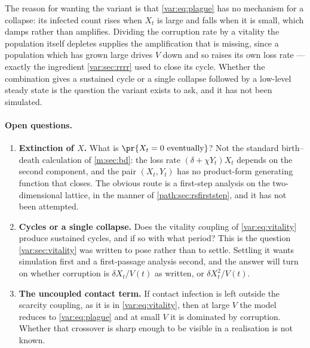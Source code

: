 The reason for wanting the variant is that \cref{var:eq:plague} has no
mechanism for a collapse: its infected count rises when $X_t$ is large and
falls when it is small, which damps rather than amplifies. Dividing the
corruption rate by a vitality the population itself depletes supplies the
amplification that is missing, since a population which has grown large
drives $V$ down and so raises its own loss rate --- exactly the ingredient
\cref{var:sec:rrrr} used to close its cycle. Whether the combination gives a
sustained cycle or a single collapse followed by a low-level steady state is
the question the variant exists to ask, and it has not been simulated.

\paragraph{Open questions.}\label{var:rem:open-plague}
\begin{enumerate}[leftmargin=1.6em,itemsep=0.2em,topsep=0.2em]
\item \textbf{Extinction of $X$.} What is $\pr{X_t=0\text{ eventually}}$?
Not the standard birth--death calculation of \cref{m:sec:bd}: the loss rate
$(\delta+\chi Y_t)X_t$ depends on the second component, and the pair
$(X_t,Y_t)$ has no product-form generating function that closes. The obvious
route is a first-step analysis on the two-dimensional lattice, in the manner
of \cref{path:sec:rsfirststep}, and it has not been attempted.
\item \textbf{Cycles or a single collapse.} Does the vitality coupling of
\cref{var:eq:vitality} produce sustained cycles, and if so with what period?
This is the question \cref{var:sec:vitality} was written to pose rather than
to settle. Settling it wants simulation first and a first-passage analysis
second, and the answer will turn on whether corruption is $\delta X_t/V(t)$ as written,
or $\delta X_t^2/V(t)$.
\item \textbf{The uncoupled contact term.} If contact infection is left
outside the scarcity coupling, as it is in \cref{var:eq:vitality}, then at
large $V$ the model reduces to \cref{var:eq:plague} and at small $V$ it is
dominated by corruption. Whether that crossover is sharp enough to be
visible in a realisation is not known.
\end{enumerate}

\FloatBarrier
